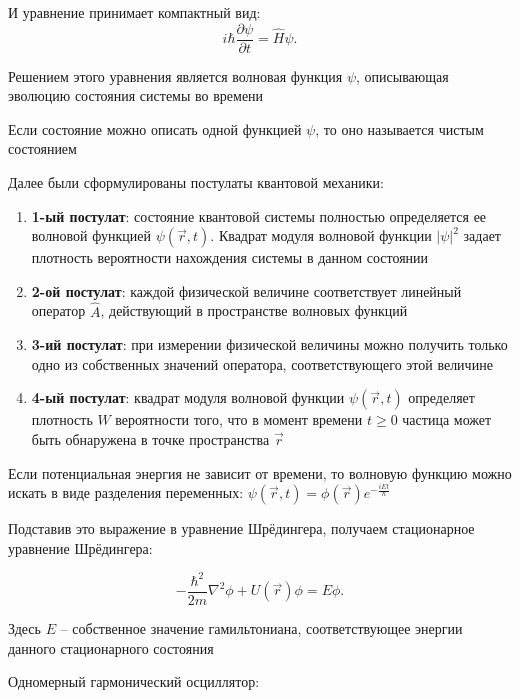 \documentclass[12pt]{article}
\begin{document}
И уравнение принимает компактный вид:
\[
i\hbar \frac{\partial \psi}{\partial t} = \hat{H}\psi.
\]

\mediumvspace

Решением этого уравнения является волновая функция $\psi$, описывающая эволюцию состояния системы во времени

Если состояние можно описать одной функцией $\psi$, то оно называется чистым состоянием

\mediumvspace

Далее были сформулированы постулаты квантовой механики:

\begin{enumerate}
    \item \textbf{1-ый постулат}: 
    состояние квантовой системы полностью определяется ее волновой функцией $\psi(\vec r, t)$.  
    Квадрат модуля волновой функции $|\psi|^2$ задает плотность вероятности нахождения системы в данном состоянии
    
    \item \textbf{2-ой постулат}:
    каждой физической величине соответствует линейный оператор $\hat{A}$, действующий в пространстве волновых функций
    
    \item \textbf{3-ий постулат}: 
    при измерении физической величины можно получить только одно из собственных значений оператора, соответствующего этой величине
    
    \item \textbf{4-ый постулат}:
    квадрат модуля волновой функции $\psi(\vec r, t)$
    определяет плотность $W$ вероятности того, что в момент времени $t \geq 0$ частица может быть обнаружена в точке пространства $\vec r$ 
\end{enumerate}

\mediumvspace

Если потенциальная энергия не зависит от времени, то волновую функцию можно искать в виде разделения переменных: $\psi(\vec r, t) = \phi(\vec r)e^{-\frac{iEt}{\hbar}}$

Подставив это выражение в уравнение Шрёдингера, получаем стационарное уравнение Шрёдингера:

\[
-\frac{\hbar^2}{2m}\nabla^2 \phi + U(\vec r)\phi = E\phi.
\]

Здесь $E$ -- собственное значение гамильтониана, соответствующее энергии данного стационарного состояния

\mediumvspace

\Ex Одномерный гармонический осциллятор:
\end{document}

